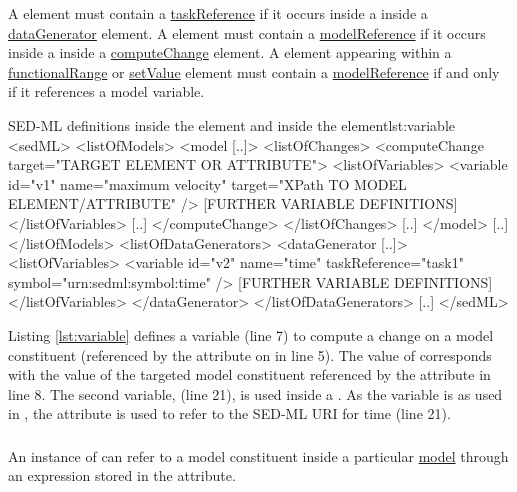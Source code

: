 A  element must contain a \hyperref[sec:taskReference]{taskReference} if it occurs inside a  inside a \hyperref[class:dataGenerator]{dataGenerator} element.
A  element must contain a \hyperref[sec:modelReference]{modelReference} if it occurs inside a  inside a \hyperref[class:computeChange]{computeChange} element.
A  element appearing within a \hyperref[class:functionalRange]{functionalRange} or \hyperref[class:setValue]{setValue} element must contain a \hyperref[sec:modelReference]{modelReference} if and only if it references a model variable.


\begin{myXmlLst}{SED-ML  definitions inside the  element and inside the  element}{lst:variable}
<sedML>
	<listOfModels>
		<model [..]>
			<listOfChanges>
				<computeChange target="TARGET ELEMENT OR ATTRIBUTE">
				<listOfVariables>
				   <variable id="v1" name="maximum velocity" target="XPath TO MODEL ELEMENT/ATTRIBUTE" />
				   [FURTHER VARIABLE DEFINITIONS]
				</listOfVariables>
				[..]
				</computeChange>
			</listOfChanges>
			[..]
		</model>
		[..]
	</listOfModels>
	<listOfDataGenerators>
		<dataGenerator [..]>
			<listOfVariables>
				<variable id="v2" name="time" taskReference="task1" symbol="urn:sedml:symbol:time" />
				[FURTHER VARIABLE DEFINITIONS]
			</listOfVariables>
		</dataGenerator>
	</listOfDataGenerators>
	[..]
</sedML>
\end{myXmlLst}

Listing \ref{lst:variable} defines a variable  (line 7) to compute a change on a model constituent (referenced by the  attribute on  in line 5). The value of  corresponds with the value of the targeted model constituent referenced by the  attribute in line 8. 
The second variable,  (line 21), is used inside a . As the variable is  as used in , the  attribute is used to refer to the SED-ML URI for time (line 21).


\subsubsection{}
\label{sec:target}
An instance of  can refer to a model constituent inside a particular \hyperref[class:model]{model} through an  expression stored in the  attribute. 

